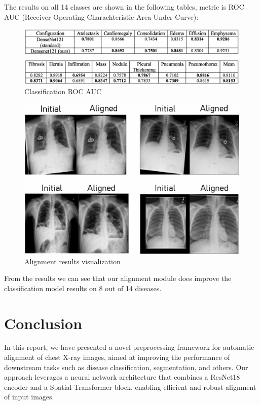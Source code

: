 \documentclass{article}
\begin{document}
The results on all 14 classes are shown in the following tables, metric is 
ROC AUC (Receiver Operating Charachteristic Area Under Curve):

\begin{figure}[ht]\label{classification}
    \vskip 0.2in
    \begin{center}
    \centerline{\includegraphics[width=\columnwidth * 2]{../images/classification.png}}
    \caption{Classification ROC AUC}
    \end{center}
    \vskip -0.2in
\end{figure}

\begin{figure}[ht]\label{visualization}
    \vskip 0.2in
    \begin{center}
    \centerline{\includegraphics[width=\columnwidth]{../images/alignment_results.png}}
    \caption{Alignment results visualization}
    \end{center}
    \vskip -0.2in
\end{figure}

From the results we can see that our alignment module does improve the classification 
 model results on 8 out of 14 diseases.

\section{Conclusion}\label{conclusion}
In this report, we have presented a novel preprocessing framework for automatic 
alignment of chest X-ray images, aimed at improving the performance of 
downstream tasks such as disease classification, segmentation, and others. Our 
approach leverages a neural network architecture that combines a ResNet18 
encoder and a Spatial Transformer block, enabling efficient and robust 
alignment of input images.
\end{document}
